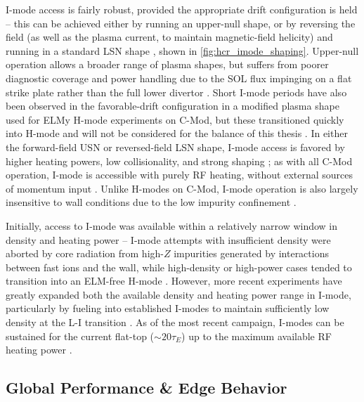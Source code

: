 I-mode access is fairly robust, provided the appropriate drift configuration is held -- this can be achieved either by running an upper-null shape, or by reversing the field (as well as the plasma current, to maintain magnetic-field helicity) and running in a standard LSN shape \cite{Hubbard2012}, shown in \cref{fig:hcr_imode_shaping}.  Upper-null operation allows a broader range of plasma shapes, but suffers from poorer diagnostic coverage and power handling due to the SOL flux impinging on a flat strike plate rather than the full lower divertor \cite{Hubbard2012,Dominguez2012}.  Short I-mode periods have also been observed in the favorable-drift configuration in a modified plasma shape used for ELMy H-mode experiments on C-Mod, but these transitioned quickly into H-mode and will not be considered for the balance of this thesis \cite{Dominguez2012,Hughes2013}.  In either the forward-field USN or reversed-field LSN shape, I-mode access is favored by higher heating powers, low collisionality, and strong 
shaping \cite{Whyte2010}; as with all C-Mod operation, I-mode is accessible with purely RF heating, without external sources of momentum input \cite{Hubbard2012b}.  Unlike H-modes on C-Mod, I-mode operation is also largely insensitive to wall conditions due to the low impurity confinement \cite{Hubbard2012}.

Initially, access to I-mode was available within a relatively narrow window in density and heating power -- I-mode attempts with insufficient density were aborted by core radiation from high-$Z$ impurities generated by interactions between fast ions and the wall, while high-density or high-power cases tended to transition into an ELM-free H-mode \cite{Whyte2010}.  However, more recent experiments have greatly expanded both the available density and heating power range in I-mode, particularly by fueling into established I-modes to maintain sufficiently low density at the L-I transition \cite{Hubbard2012b}.  As of the most recent campaign, I-modes can be sustained for the current flat-top ($\sim 20\tau_E$) up to the maximum available RF heating power \cite{Hubbard2012,Hubbard2012b}.

\subsection{Global Performance \& Edge Behavior}\label{subsec:hcr_imode_performance}


